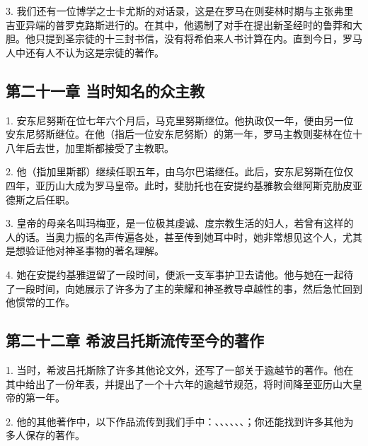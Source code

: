 3. 我们还有一位博学之士卡尤斯的对话录，这是在罗马在则斐林时期与主张弗里吉亚异端的普罗克路斯进行的。在其中，他遏制了对手在提出新圣经时的鲁莽和大胆。他只提到圣宗徒的十三封书信，没有将希伯来人书计算在内。直到今日，罗马人中还有人不认为这是宗徒的著作。\par


\subsection{第二十一章 当时知名的众主教}

1. 安东尼努斯在位七年六个月后，马克里努斯继位。他执政仅一年，便由另一位安东尼努斯继位。在他（指后一位安东尼努斯）的第一年，罗马主教则斐林在位十八年后去世，加里斯都接受了主教职。\par

2. 他（指加里斯都）继续任职五年，由乌尔巴诺继任。此后，安东尼努斯在位仅四年，亚历山大成为罗马皇帝。此时，斐肋托也在安提约基雅教会继阿斯克肋皮亚德斯之后任职。\par

3. 皇帝的母亲名叫玛梅亚，是一位极其虔诚、度宗教生活的妇人，若曾有这样的人的话。当奥力振的名声传遍各处，甚至传到她耳中时，她非常想见这个人，尤其是想验证他对神圣事物的著名理解。\par

4. 她在安提约基雅逗留了一段时间，便派一支军事护卫去请他。他与她在一起待了一段时间，向她展示了许多为了主的荣耀和神圣教导卓越性的事，然后急忙回到他惯常的工作。\par


\subsection{第二十二章 希波吕托斯流传至今的著作}

1. 当时，希波吕托斯除了许多其他论文外，还写了一部关于逾越节的著作。他在其中给出了一份年表，并提出了一个十六年的逾越节规范，将时间降至亚历山大皇帝的第一年。\par

2. 他的其他著作中，以下作品流传到我们手中：、、、、、、；你还能找到许多其他为多人保存的著作。\par

